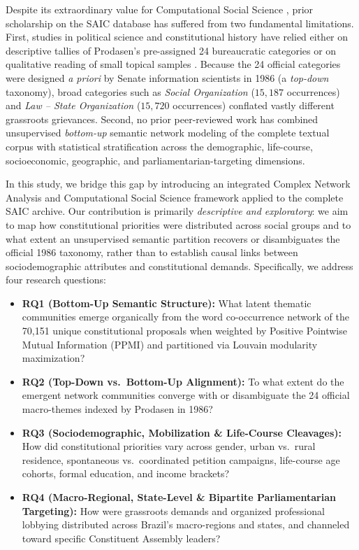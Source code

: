 \documentclass[pdflatex,sn-basic]{sn-jnl}
\begin{document}
Despite its extraordinary value for Computational Social Science \citep{lazer2009computational,grimmer2013text}, prior scholarship on the SAIC database has suffered from two fundamental limitations. First, studies in political science and constitutional history have relied either on descriptive tallies of Prodasen's pre-assigned 24 bureaucratic categories or on qualitative reading of small topical samples \citep{mcdonald2022making,santos2024lazer}. Because the 24 official categories were designed \textit{a priori} by Senate information scientists in 1986 (a \textit{top-down} taxonomy), broad categories such as \textit{Social Organization} ($15,187$ occurrences) and \textit{Law -- State Organization} ($15,720$ occurrences) conflated vastly different grassroots grievances. Second, no prior peer-reviewed work has combined unsupervised \textit{bottom-up} semantic network modeling of the complete textual corpus with statistical stratification across the demographic, life-course, socioeconomic, geographic, and parliamentarian-targeting dimensions.

In this study, we bridge this gap by introducing an integrated Complex Network Analysis and Computational Social Science framework applied to the complete SAIC archive. %
Our contribution is primarily \emph{descriptive and exploratory}: we aim to map how constitutional priorities were distributed across social groups and to what extent an unsupervised semantic partition recovers or disambiguates the official 1986 taxonomy, rather than to establish causal links between sociodemographic attributes and constitutional demands. Specifically, we address four research questions:
\begin{itemize}
    \item \textbf{RQ1 (Bottom-Up Semantic Structure):} What latent thematic communities emerge organically from the word co-occurrence network of the 70,151 unique constitutional proposals when weighted by Positive Pointwise Mutual Information (PPMI) and partitioned via Louvain modularity maximization?
    \item \textbf{RQ2 (Top-Down vs.\ Bottom-Up Alignment):} To what extent do the emergent network communities converge with or disambiguate the 24 official macro-themes indexed by Prodasen in 1986?
    \item \textbf{RQ3 (Sociodemographic, Mobilization \& Life-Course Cleavages):} How did constitutional priorities vary across gender, urban vs.\ rural residence, spontaneous vs.\ coordinated petition campaigns, life-course age cohorts, formal education, and income brackets?
    \item \textbf{RQ4 (Macro-Regional, State-Level \& Bipartite Parliamentarian Targeting):} How were grassroots demands and organized professional lobbying distributed across Brazil's macro-regions and states, and channeled toward specific Constituent Assembly leaders?
\end{itemize}
\end{document}
